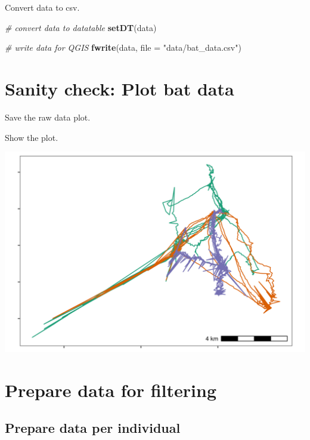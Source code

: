 \documentclass[
]{scrreprt}
\newenvironment{Shaded}{}{}
\newcommand{\CommentTok}[1]{\textcolor[rgb]{0.38,0.63,0.69}{\textit{#1}}}
\newcommand{\DataTypeTok}[1]{\textcolor[rgb]{0.56,0.13,0.00}{#1}}
\newcommand{\KeywordTok}[1]{\textcolor[rgb]{0.00,0.44,0.13}{\textbf{#1}}}
\newcommand{\NormalTok}[1]{#1}
\newcommand{\OperatorTok}[1]{\textcolor[rgb]{0.40,0.40,0.40}{#1}}
\newcommand{\StringTok}[1]{\textcolor[rgb]{0.25,0.44,0.63}{#1}}
\begin{document}
Convert data to csv.

\begin{Shaded}
\begin{Highlighting}[]
\CommentTok{\# convert data to datatable}
\KeywordTok{setDT}\NormalTok{(data)}

\CommentTok{\# write data for QGIS}
\KeywordTok{fwrite}\NormalTok{(data, }\DataTypeTok{file =} \StringTok{"data/bat\_data.csv"}\NormalTok{)}
\end{Highlighting}
\end{Shaded}

\hypertarget{sanity-check-plot-bat-data}{%
\section{Sanity check: Plot bat data}\label{sanity-check-plot-bat-data}}

Save the raw data plot.

Show the plot.

\includegraphics{figures/fig_bat_raw.png}

\hypertarget{prepare-data-for-filtering}{%
\section{Prepare data for filtering}\label{prepare-data-for-filtering}}

\hypertarget{prepare-data-per-individual}{%
\subsection{Prepare data per individual}\label{prepare-data-per-individual}}

\begin{Shaded}
\end{Shaded}
\end{document}
